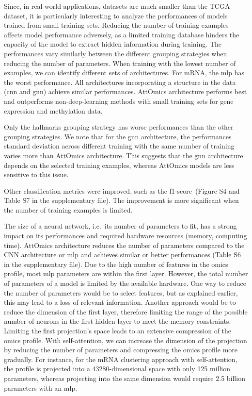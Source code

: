 \documentclass[../main.tex]{subfiles}
\begin{document}
	 Since, in real-world applications, datasets are much smaller than the TCGA dataset, it is particularly interesting to analyze the performances of models trained from small training sets.
	 Reducing the number of training examples affects model performance adversely, as a limited training database hinders the capacity of the model to extract hidden information during training.
	 The performances vary similarly between the different grouping strategies when reducing the number of parameters.
	 When training with the lowest number of examples, we can identify different sets of architectures.
	 For mRNA, the \gls{mlp} has the worst performance.
	 All architectures incorporating a structure in the data (\gls{cnn} and \gls{gnn}) achieve similar performances.
	 AttOmics architecture performs best and outperforms non-deep-learning methods with small training sets for gene expression and methylation data.

	 Only the hallmarks grouping strategy has worse performances than the other grouping strategies.
	 We note that for the \gls{gnn} architecture, the performances standard deviation across different training with the same number of training varies more than AttOmics architecture.
	 This suggests that the \gls{gnn} architecture depends on the selected training examples, whereas AttOmics models are less sensitive to this issue.

	 Other classification metrics were improved, such as the f1-score~(Figure S4 and Table S7 in the supplementary file).
	 The improvement is more significant when the number of training examples is limited.

	 The size of a neural network, i.e.\ its number of parameters to fit, has a strong impact on its performances and required hardware resources (memory, computing time).
	 AttOmics architecture reduces the number of parameters compared to the CNN architecture or \gls{mlp} and achieves similar or better performances (Table S6 in the supplementary file).
	 Due to the high number of features in the omics profile, most \gls{mlp} parameters are within the first layer.
	 However, the total number of parameters of a model is limited by the available hardware.
	 One way to reduce the number of parameters would be to select features, but as explained earlier, this may lead to a loss of relevant information.
	 Another approach would be to reduce the dimension of the first layer, therefore limiting the range of the possible number of neurons in the first hidden layer to meet the memory constraints.
	 Limiting the first projection's space leads to an extensive compression of the omics profile.
	 With self-attention, we can increase the dimension of the projection by reducing the number of parameters and compressing the omics profile more gradually.
	 For instance, for the mRNA clustering approach with self-attention, the profile is projected into a 43280-dimensional space with only 125 million parameters, whereas projecting into the same dimension would require 2.5 billion parameters with an \gls{mlp}.
\end{document}

